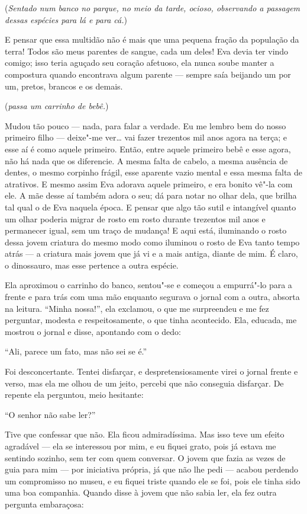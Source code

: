 \noindent (\textit{Sentado num banco no parque, no meio da tarde, ocioso, observando a passagem
dessas espécies para lá e para cá.})

E pensar que essa multidão não é mais que uma
pequena fração da população da terra! Todos são meus parentes de sangue, cada um
deles! Eva devia ter vindo comigo; isso teria aguçado seu coração afetuoso,
ela nunca soube manter a compostura quando encontrava algum parente --- sempre saía
beijando um por um, pretos, brancos e os demais.

(\textit{passa um carrinho de bebê.})

Mudou tão pouco --- nada, para falar a verdade. Eu me lembro bem do nosso primeiro filho --- deixe"-me
ver\ldots{} vai fazer trezentos mil anos agora na terça; e esse aí é como aquele
primeiro. Então, entre aquele primeiro bebê e esse agora, não há nada que os
diferencie. A mesma falta de cabelo, a mesma ausência de dentes, o mesmo corpinho
frágil, esse aparente vazio mental e essa mesma falta de atrativos. E mesmo assim
Eva adorava aquele primeiro, e era bonito vê"-la com ele. A mãe desse aí
também adora o seu; dá para notar no olhar dela, que brilha tal qual o de Eva naquela
época. E pensar que algo tão sutil e intangível quanto um olhar poderia migrar de
rosto em rosto durante trezentos mil anos e permanecer igual, sem um traço de
mudança! E aqui está, iluminando o rosto dessa jovem criatura do mesmo modo como
iluminou o rosto de Eva tanto tempo atrás --- a criatura mais jovem que já vi e a
mais antiga, diante de mim. É claro, o dinossauro, mas esse pertence a outra
espécie.

Ela aproximou o carrinho do banco, sentou"-se e começou a empurrá"-lo para a frente
e para trás com uma mão enquanto segurava o jornal com a outra, absorta na
leitura. “Minha nossa!”, ela exclamou, o que me surpreendeu e me fez
perguntar, modesta e respeitosamente, o que tinha acontecido. Ela,
educada, me mostrou o jornal e disse, apontando com o dedo:

“Ali, parece um fato, mas não sei se é.”

Foi desconcertante. Tentei disfarçar, e despretensiosamente virei o jornal frente e
verso, mas ela me olhou de um jeito, percebi que não conseguia disfarçar. De
repente ela perguntou, meio hesitante:

“O senhor não sabe ler?”

Tive que confessar que não. Ela ficou admiradíssima. Mas isso teve um efeito
agradável --- ela se interessou por mim, e eu fiquei grato, pois já estava me
sentindo sozinho, sem ter com quem conversar. O jovem que fazia as vezes
de guia para mim --- por iniciativa própria, já que não lhe pedi --- acabou
perdendo um compromisso no museu, e eu fiquei triste quando ele se foi, pois ele tinha    
sido uma boa companhia. Quando disse à jovem que não sabia ler, ela fez outra
pergunta embaraçosa:


